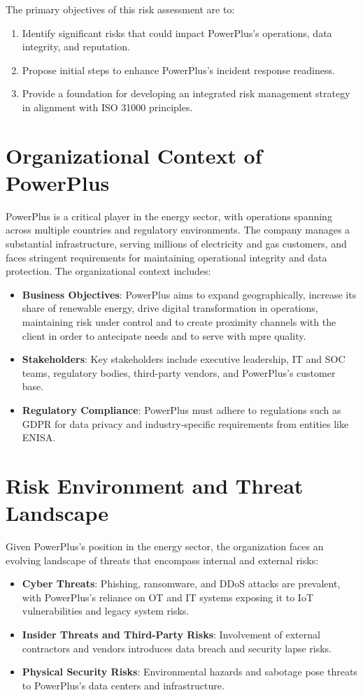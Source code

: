 The primary objectives of this risk assessment are to:
\begin{enumerate}
    \item Identify significant risks that could impact PowerPlus’s operations, data integrity, and reputation.
    \item Propose initial steps to enhance PowerPlus’s incident response readiness.
    \item Provide a foundation for developing an integrated risk management strategy in alignment with ISO 31000 principles.
\end{enumerate}

\section{Organizational Context of PowerPlus}

PowerPlus is a critical player in the energy sector, with operations spanning across multiple countries and regulatory environments. 
The company manages a substantial infrastructure, serving millions of electricity and gas customers, and faces stringent requirements for maintaining operational integrity and data protection. 
The organizational context includes:
\begin{itemize}
    \item \textbf{Business Objectives}: PowerPlus aims to expand geographically, increase its share of renewable energy, drive digital transformation in operations, maintaining risk under control and to create proximity channels with the client in order to antecipate needs and to serve with mpre quality.
    \item \textbf{Stakeholders}: Key stakeholders include executive leadership, IT and SOC teams, regulatory bodies, third-party vendors, and PowerPlus’s customer base.
    \item \textbf{Regulatory Compliance}: PowerPlus must adhere to regulations such as GDPR for data privacy and industry-specific requirements from entities like ENISA.
\end{itemize}

\section{Risk Environment and Threat Landscape}

Given PowerPlus’s position in the energy sector, the organization faces an evolving landscape of threats that encompass internal and external risks:
\begin{itemize}
    \item \textbf{Cyber Threats}: Phishing, ransomware, and DDoS attacks are prevalent, with PowerPlus’s reliance on OT and IT systems exposing it to IoT vulnerabilities and legacy system risks.
    \item \textbf{Insider Threats and Third-Party Risks}: Involvement of external contractors and vendors introduces data breach and security lapse risks.
    \item \textbf{Physical Security Risks}: Environmental hazards and sabotage pose threats to PowerPlus’s data centers and infrastructure.
\end{itemize}

